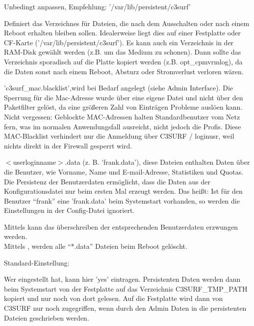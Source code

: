\begin{itemize}
\begin{description}
  Unbedingt anpassen, Empfehlung: '/var/lib/persistent/c3surf'

  Definiert das Verzeichnes für Dateien, die nach dem Ausschalten
  oder nach einem Reboot erhalten bleiben sollen. Idealerweise liegt dies auf
  einer Festplatte oder CF-Karte ('/var/lib/persistent/c3surf'). Es kann auch ein Verzeichnis
  in der RAM-Disk gewählt werden (z.B. um das Medium zu schonen). Dann sollte das
  Verzeichnis sporadisch auf die Platte kopiert werden (z.B. opt\_cpmvrmlog),
  da die Daten sonst nach einem Reboot, Absturz oder Stromverlust verloren wären.

\newpage

  'c3surf\_mac.blacklist',wird bei Bedarf angelegt (siehe Admin
  Interface). Die Sperrung für die Mac-Adresse wurde über eine eigene Datei
  und nicht über den Paketfilter gelöst, da eine größeren Zahl von Einträgen
  Probleme auslöen kann. Nicht vergessen: Geblockte MAC-Adressen halten
  Standardbenutzer vom Netz fern, was im normalen Anwendungsfall ausreicht,
  nicht jedoch die Profis. Diese MAC-Blacklist verhindert nur die
  Anmeldung über C3SURF / loginusr, weil nichts direkt in der Firewall
  gesperrt wird.


  $<$userloginname$>$.data (z. B. 'frank.data'), diese Dateien 
  enthalten Daten über die Benutzer, wie Vorname, Name und E-mail-Adresse,
  Statistiken und Quotas. Die Persistenz der Benutzerdaten ermöglicht,
  dass die Daten aus der Konfigurationsdatei nur beim ersten Mal erzeugt werden.
  Das heißt: Ist für den Benutzer ``frank'' eine 'frank.data' beim Systemstart
  vorhanden, so werden die Einstellungen in der Config-Datei ignoriert.
\parskip 12pt

  Mittels 
  kann das überschreiben der entsprechenden Benutzerdaten erzwungen werden.\\
  Mittels ,
  werden alle ``*.data'' Dateien beim Reboot gelöscht.


  Standard-Einstellung: 

  Wer 
  eingestellt hat, kann hier 'yes' eintragen. Persistenten Daten werden
  dann beim Systemstart von der Festplatte auf das Verzeichnis C3SURF\_TMP\_PATH
  kopiert und nur noch von dort gelesen. Auf die Festplatte wird dann von
  C3SURF nur noch zugegriffen, wenn durch den Admin Daten in die
  persistenten Dateien geschrieben werden.


\end{description}
\end{itemize}
